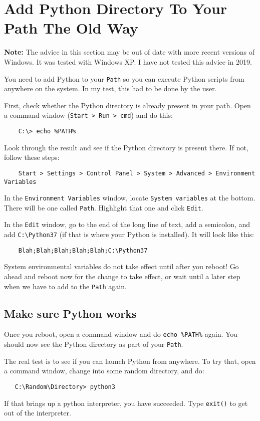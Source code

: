 \section{Add Python Directory To Your Path The Old Way}

\textbf{Note:} The advice in this section may be out of date with more
recent versions of Windows. It was tested with Windows XP. I have not tested this advice in 2019.

You need to add Python to your \verb=Path= so you can execute Python scripts
from anywhere on the system. In my test, this had to be done by the user.

First, check whether the Python directory is already present in your
path. Open a command window (\verb=Start > Run > cmd=) and do this:

\begin{verbatim}
    C:\> echo %PATH%
\end{verbatim}

Look through the result and see if the Python directory is present
there. If not, follow these steps:

\begin{verbatim}
    Start > Settings > Control Panel > System > Advanced > Environment Variables
\end{verbatim}

In the \verb=Environment Variables= window, locate \verb=System variables= at the
bottom. There will be one called \verb=Path=. Highlight that one and
click \verb=Edit=.

In the \verb=Edit= window, go to the end of the long line of text, add a
semicolon, and add \verb=C:\Python37= (if that is where your Python is
installed). It will look like this:

\begin{verbatim}
    Blah;Blah;Blah;Blah;Blah;C:\Python37
\end{verbatim}

System environmental variables do not take effect until after you
reboot! Go ahead and reboot now for the change to take effect, or
wait until a later step when we have to add to the \verb=Path= again.

\subsection{Make sure Python works}

Once you reboot, open a command window and do \verb=echo %PATH%= again.
You should now see the Python directory as part of your \verb=Path=.

The real test is to see if you can launch Python from anywhere. To try
that, open a command window, change into some random directory, and
do:

\begin{verbatim}
   C:\Random\Directory> python3
\end{verbatim}

If that brings up a python interpreter, you have succeeded.
Type \verb=exit()= to get out of the interpreter.
